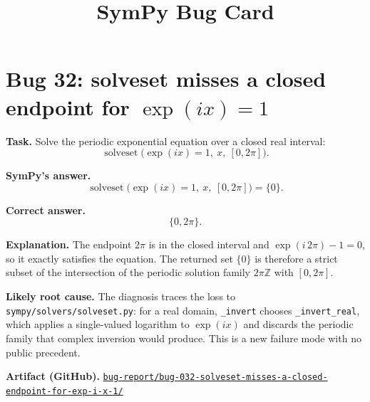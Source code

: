 \documentclass[11pt]{article}
\title{SymPy Bug Card}
\author{}
\date{}
\newcommand{\artifactrepo}{https://github.com/TODO-org/TODO-repo}
\newcommand{\bugbundle}[1]{\href{\artifactrepo/tree/main/bug-report/#1}{\nolinkurl{bug-report/#1/}}}
\begin{document}
\maketitle

\section*{Bug 32: solveset misses a closed endpoint for \texorpdfstring{\(\exp(i x)=1\)}{exp(i*x)=1}}

\begin{counterexamplebox}
\textbf{Task.} Solve the periodic exponential equation over a closed real interval:
\[
\operatorname{solveset}\bigl(\exp(i x)=1,\ x,\ [0,2\pi]\bigr).
\]

\medskip
\textbf{SymPy's answer.}
\[
\operatorname{solveset}\bigl(\exp(i x)=1,\ x,\ [0,2\pi]\bigr)=\{0\}.
\]

\medskip
\textbf{Correct answer.}
\[
\{0,2\pi\}.
\]

\medskip
\textbf{Explanation.} The endpoint \(2\pi\) is in the closed interval and
\(\exp(i\,2\pi)-1=0\), so it exactly satisfies the equation.  The returned set
\(\{0\}\) is therefore a strict subset of the intersection of the periodic
solution family \(2\pi\mathbb{Z}\) with \([0,2\pi]\).

\medskip
\textbf{Likely root cause.} The diagnosis traces the loss to
\nolinkurl{sympy/solvers/solveset.py}: for a real domain, \texttt{\_invert}
chooses \texttt{\_invert\_real}, which applies a single-valued logarithm to
\(\exp(i x)\) and discards the periodic family that complex inversion would
produce.  This is a new failure mode with no public precedent.

\medskip
\textbf{Artifact (GitHub).} \bugbundle{bug-032-solveset-misses-a-closed-endpoint-for-exp-i-x-1}
\end{counterexamplebox}
\end{document}
